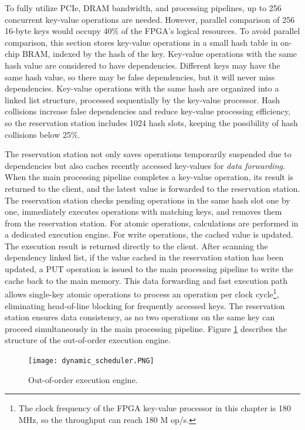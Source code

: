 To fully utilize PCIe, DRAM bandwidth, and processing pipelines, up to 256 concurrent key-value operations are needed. However, parallel comparison of 256 16-byte keys would occupy 40\% of the FPGA's logical resources. To avoid parallel comparison, this section stores key-value operations in a small hash table in on-chip BRAM, indexed by the hash of the key. Key-value operations with the same hash value are considered to have dependencies. Different keys may have the same hash value, so there may be false dependencies, but it will never miss dependencies. Key-value operations with the same hash are organized into a linked list structure, processed sequentially by the key-value processor. Hash collisions increase false dependencies and reduce key-value processing efficiency, so the reservation station includes 1024 hash slots, keeping the possibility of hash collisions below 25\%.

The reservation station not only saves operations temporarily suspended due to dependencies but also caches recently accessed key-values for \textit{data forwarding}. When the main processing pipeline completes a key-value operation, its result is returned to the client, and the latest value is forwarded to the reservation station. The reservation station checks pending operations in the same hash slot one by one, immediately executes operations with matching keys, and removes them from the reservation station. For atomic operations, calculations are performed in a dedicated execution engine. For write operations, the cached value is updated. The execution result is returned directly to the client. After scanning the dependency linked list, if the value cached in the reservation station has been updated, a PUT operation is issued to the main processing pipeline to write the cache back to the main memory. This data forwarding and fast execution path allows single-key atomic operations to process an operation per clock cycle\footnote{The clock frequency of the FPGA key-value processor in this chapter is 180 MHz, so the throughput can reach 180 M op/s.}, eliminating head-of-line blocking for frequently accessed keys. The reservation station ensures data consistency, as no two operations on the same key can proceed simultaneously in the main processing pipeline. Figure \ref{kvdirect:fig:ooo-mem-access} describes the structure of the out-of-order execution engine.

\begin{figure}[htbp]
	\centering
	\texttt{[image: dynamic\_scheduler.PNG]}
	\caption{Out-of-order execution engine.}
	\label{kvdirect:fig:ooo-mem-access}
\end{figure}

